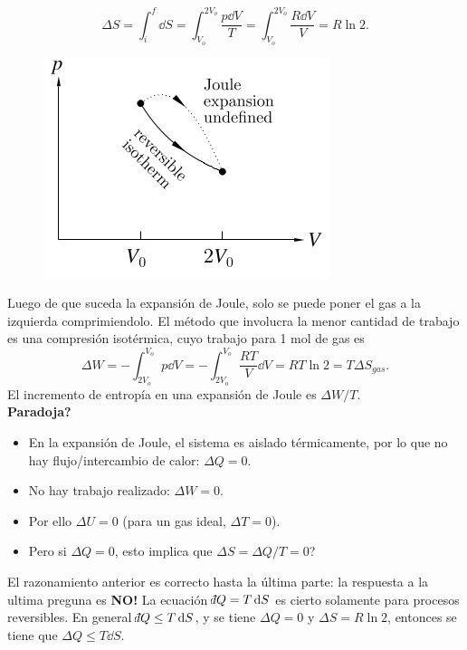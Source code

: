 	$$ \Delta S = \int _i ^f \dd{S} = \int _{V_o} ^{2V_o} \frac{p\dd{V}}{T} = \int _{V_o} ^{2V_o} \frac{R\dd{V}}{V} = R\ln{2}. $$



	\begin{figure}[H]
		\centering
		\includegraphics[scale=0.35]{./img/expansionJoule2.png}
		\label{expansionJoule}
	\end{figure}

Luego de que suceda la expansión de Joule, solo se puede poner el gas a la izquierda comprimiendolo. El método que involucra la menor cantidad de trabajo es una compresión isotérmica, cuyo trabajo para 1 mol de gas es
	$$ \Delta W = - \int _{2V_o} ^{V_o} p\dd{V} = - \int _{2V_o} ^{V_o} \frac{RT}{V} \dd{V} = RT\ln{2} = T \Delta S_{gas}. $$
El incremento de entropía en una expansión de Joule es $\Delta W/T$.\\


{\Large \textbf{Paradoja?}} \\
\begin{itemize}
	\item En la expansión de Joule, el sistema es aislado térmicamente, por lo que no hay flujo/intercambio de calor: $\Delta Q = 0$.
	\item No hay trabajo realizado: $\Delta W = 0$.
	\item Por ello $\Delta U = 0$ (para un gas ideal, $\Delta T = 0$).
	\item Pero si $\Delta Q = 0$, esto implica que $\Delta S = \Delta Q/T = 0$?
\end{itemize}
 El razonamiento anterior es correcto hasta la última parte: la respuesta a la ultima preguna es \textbf{NO!} La ecuación $\dbar Q = T\dd{S}$ es cierto solamente para procesos reversibles. En general $\dbar Q \leq T\dd{S}$, y se tiene $\Delta Q = 0$ y $\Delta S = R \ln{2}$, entonces se tiene que $\Delta Q \leq T \dd{S}$.




